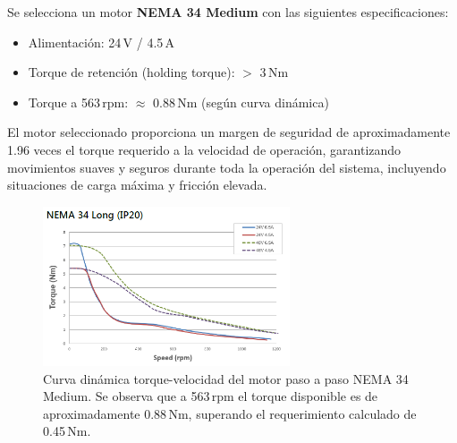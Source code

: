 Se selecciona un motor \textbf{NEMA 34 Medium} con las siguientes especificaciones:
\begin{itemize}
    \item Alimentación: 24\,V / 4.5\,A
    \item Torque de retención (holding torque): $>$ 3\,Nm
    \item Torque a 563\,rpm: $\approx$ 0.88\,Nm (según curva dinámica)
\end{itemize}

El motor seleccionado proporciona un margen de seguridad de aproximadamente 1.96 veces el torque requerido a la velocidad de operación, garantizando movimientos suaves y seguros durante toda la operación del sistema, incluyendo situaciones de carga máxima y fricción elevada.

\begin{figure}[H]
    \centering
    \includegraphics[width=0.65\textwidth]{img/Nema34.png}
    \caption{Curva dinámica torque-velocidad del motor paso a paso NEMA 34 Medium. Se observa que a 563\,rpm el torque disponible es de aproximadamente 0.88\,Nm, superando el requerimiento calculado de 0.45\,Nm.}
    \label{fig:Curva_din_nema34}
\end{figure}